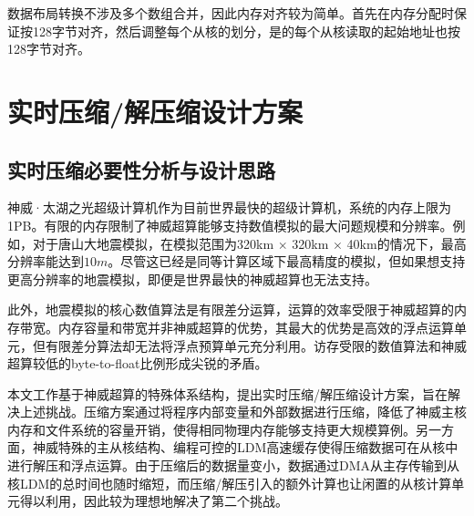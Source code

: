数据布局转换不涉及多个数组合并，因此内存对齐较为简单。首先在内存分配时保证按128字节对齐，然后调整每个从核的划分，是的每个从核读取的起始地址也按128字节对齐。




\section{实时压缩/解压缩设计方案}
\label{sec:实时压缩/解压缩设计方案}
\subsection{实时压缩必要性分析与设计思路}

神威·太湖之光超级计算机作为目前世界最快的超级计算机，系统的内存上限为1PB。有限的内存限制了神威超算能够支持数值模拟的最大问题规模和分辨率。例如，对于唐山大地震模拟，在模拟范围为320km $\times$ 320km $\times$ 40km的情况下，最高分辨率能达到$10m$。尽管这已经是同等计算区域下最高精度的模拟，但如果想支持更高分辨率的地震模拟，即便是世界最快的神威超算也无法支持。

此外，地震模拟的核心数值算法是有限差分运算，运算的效率受限于神威超算的内存带宽。内存容量和带宽并非神威超算的优势，其最大的优势是高效的浮点运算单元，但有限差分算法却无法将浮点预算单元充分利用。访存受限的数值算法和神威超算较低的byte-to-float比例形成尖锐的矛盾。

本文工作基于神威超算的特殊体系结构，提出实时压缩/解压缩设计方案，旨在解决上述挑战。压缩方案通过将程序内部变量和外部数据进行压缩，降低了神威主核内存和文件系统的容量开销，使得相同物理内存能够支持更大规模算例。另一方面，神威特殊的主从核结构、编程可控的LDM高速缓存使得压缩数据可在从核中进行解压和浮点运算。由于压缩后的数据量变小，数据通过DMA从主存传输到从核LDM的总时间也随时缩短，而压缩/解压引入的额外计算也让闲置的从核计算单元得以利用，因此较为理想地解决了第二个挑战。

